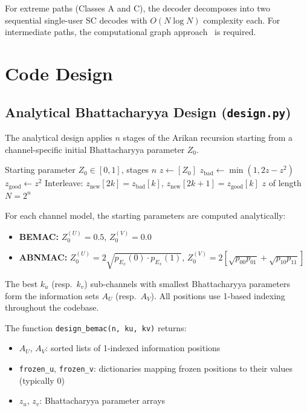 \documentclass[11pt,a4paper]{article}
\begin{document}
For extreme paths (Classes A and C), the decoder decomposes into two
sequential single-user SC decodes with $O(N \log N)$ complexity each.
For intermediate paths, the computational graph approach~\cite{ren2025}
is required.


\section{Code Design}
\label{sec:design}

\subsection{Analytical Bhattacharyya Design (\texttt{design.py})}

The analytical design applies $n$ stages of the Arikan recursion starting
from a channel-specific initial Bhattacharyya parameter $Z_0$.

\begin{algorithm}[h]
\caption{Bhattacharyya Recursion}
\begin{algorithmic}[1]
\Require Starting parameter $Z_0 \in [0,1]$, stages $n$
\State $z \gets [Z_0]$
  \State $z_{\text{bad}} \gets \min(1, 2z - z^2)$ 
  \State $z_{\text{good}} \gets z^2$ 
  \State Interleave: $z_{\text{new}}[2k] = z_{\text{bad}}[k]$, $z_{\text{new}}[2k{+}1] = z_{\text{good}}[k]$
\EndFor
\State \Return $z$ of length $N = 2^n$
\end{algorithmic}
\end{algorithm}

For each channel model, the starting parameters are computed analytically:
\begin{itemize}
  \item \textbf{BEMAC:} $Z_0^{(U)} = 0.5$, $Z_0^{(V)} = 0.0$
  \item \textbf{ABNMAC:} $Z_0^{(U)} = 2\sqrt{p_{E_x}(0) \cdot p_{E_x}(1)}$,
        $Z_0^{(V)} = 2[\sqrt{p_{00} p_{01}} + \sqrt{p_{10} p_{11}}]$
\end{itemize}

The best $k_u$ (resp.\ $k_v$) sub-channels with smallest Bhattacharyya
parameters form the information sets $A_U$ (resp.\ $A_V$). All positions
use 1-based indexing throughout the codebase.

The function \texttt{design\_bemac(n, ku, kv)} returns:
\begin{itemize}
  \item $A_U$, $A_V$: sorted lists of 1-indexed information positions
  \item \texttt{frozen\_u}, \texttt{frozen\_v}: dictionaries mapping frozen positions to their values (typically 0)
  \item $z_u$, $z_v$: Bhattacharyya parameter arrays
\end{itemize}
\end{document}
